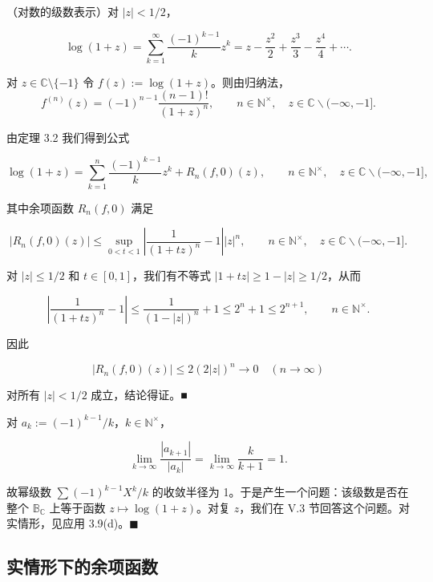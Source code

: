 \begin{example}

（对数的级数表示）对 $|z| < 1/2$，

\[
\log(1+z)=\sum_{k=1}^{\infty}\frac{(-1)^{k-1}}{k}z^{k}=z-\frac{z^{2}}{2}+\frac{z^{3}}{3}-\frac{z^{4}}{4}+\cdots.
\]

\proofhead
对 $ z \in \mathbb{C} \setminus \{-1\} $ 令 $ f(z) := \log(1 + z) $。则由归纳法，
\[
f^{(n)}(z)=(-1)^{n-1}\frac{(n-1)!}{(1+z)^{n}},\qquad n\in\mathbb{N}^{\times},\quad z\in\mathbb{C}\backslash(-\infty,-1].
\]

由定理 3.2 我们得到公式

\begin{equation}
\log(1+z)=\sum_{k=1}^{n}\frac{(-1)^{k-1}}{k}z^{k}+R_{n}(f,0)(z),\qquad n\in\mathbb{N}^{\times},\quad z\in\mathbb{C}\backslash(-\infty,-1],
\end{equation}

其中余项函数 $ R_{n}(f,0) $ 满足

\[
|R_{n}(f,0)(z)|\leq\sup_{0<t<1}\left|\frac{1}{(1+t z)^{n}}-1\right||z|^{n},\qquad n\in\mathbb{N}^{\times},\quad z\in\mathbb{C}\backslash(-\infty,-1].
\]

对 $ |z| \leq 1/2 $ 和 $ t \in [0,1] $，我们有不等式 $ |1 + tz| \geq 1 - |z| \geq 1/2 $，从而

\[
\left|\frac{1}{(1+t z)^{n}}-1\right|\leq\frac{1}{(1-|z|)^{n}}+1\leq2^{n}+1\leq2^{n+1},\qquad n\in\mathbb{N}^{\times}.
\]

因此

\[
|R_{n}(f,0)(z)|\leq2(2\left|z\right|)^{n}\to0\quad(n\to\infty)
\]

对所有 $ |z| < 1/2 $ 成立，结论得证。■

\end{example}

\begin{remark}

对 $ a_k := (-1)^{k-1}/k $，$ k \in \mathbb{N}^\times $，

\[
\lim_{k\to\infty}\frac{|a_{k+1}|}{|a_{k}|}=\lim_{k\to\infty}\frac{k}{k+1}=1.
\]

故幂级数 $ \sum(-1)^{k-1}X^k/k $ 的收敛半径为 1。于是产生一个问题：该级数是否在整个 $ \mathbb{B}_{\mathbb{C}} $ 上等于函数 $ z \mapsto \log(1+z) $。对复 $ z $，我们在 V.3 节回答这个问题。对实情形，见应用 3.9(d)。$ \blacksquare $

\end{remark}

\subsection*{实情形下的余项函数}

